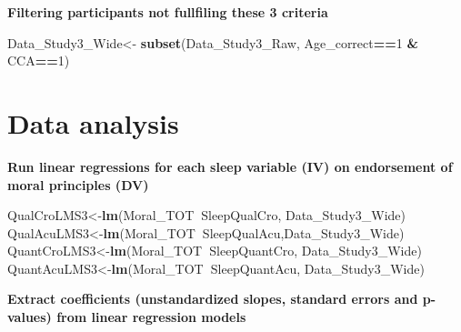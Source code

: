 \documentclass[
]{book}
\newenvironment{Shaded}{\begin{snugshade}}{\end{snugshade}}
\newcommand{\DecValTok}[1]{\textcolor[rgb]{0.00,0.00,0.81}{#1}}
\newcommand{\KeywordTok}[1]{\textcolor[rgb]{0.13,0.29,0.53}{\textbf{#1}}}
\newcommand{\NormalTok}[1]{#1}
\newcommand{\OperatorTok}[1]{\textcolor[rgb]{0.81,0.36,0.00}{\textbf{#1}}}
\newcommand{\StringTok}[1]{\textcolor[rgb]{0.31,0.60,0.02}{#1}}
\begin{document}
\textbf{Filtering participants not fullfiling these 3 criteria}

\begin{Shaded}
\begin{Highlighting}[]
\NormalTok{Data_Study3_Wide<-}\StringTok{ }\KeywordTok{subset}\NormalTok{(Data_Study3_Raw, Age_correct}\OperatorTok{==}\DecValTok{1} \OperatorTok{&}\StringTok{ }\NormalTok{CCA}\OperatorTok{==}\DecValTok{1}\NormalTok{)}
\end{Highlighting}
\end{Shaded}

\hypertarget{data-analysis-2}{%
\section{Data analysis}\label{data-analysis-2}}

\textbf{Run linear regressions for each sleep variable (IV) on endorsement of moral principles (DV)}

\begin{Shaded}
\begin{Highlighting}[]
\NormalTok{QualCroLMS3<-}\KeywordTok{lm}\NormalTok{(Moral_TOT}\OperatorTok{~}\NormalTok{SleepQualCro, Data_Study3_Wide)}
\NormalTok{QualAcuLMS3<-}\KeywordTok{lm}\NormalTok{(Moral_TOT}\OperatorTok{~}\NormalTok{SleepQualAcu,Data_Study3_Wide)}
\NormalTok{QuantCroLMS3<-}\KeywordTok{lm}\NormalTok{(Moral_TOT}\OperatorTok{~}\NormalTok{SleepQuantCro, Data_Study3_Wide)}
\NormalTok{QuantAcuLMS3<-}\KeywordTok{lm}\NormalTok{(Moral_TOT}\OperatorTok{~}\NormalTok{SleepQuantAcu, Data_Study3_Wide)}
\end{Highlighting}
\end{Shaded}

\textbf{Extract coefficients (unstandardized slopes, standard errors and p-values) from linear regression models }
\end{document}
